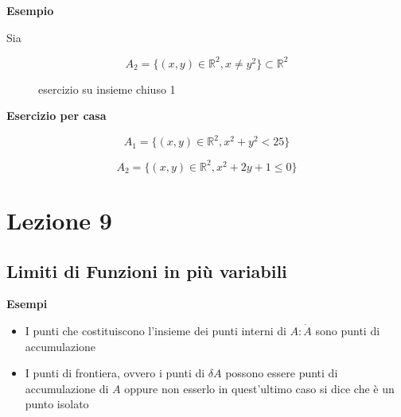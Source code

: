 \documentclass[11pt]{article}
\begin{document}
\textbf{Esempio} 

Sia

\[
    A_2= \{ (x,y) \in \mathbb{R}^{2}, x \neq y^{2}\} \subset \mathbb{R}^{2}
\]

\begin{figure}[ht]
    \centering
    \caption{esercizio su insieme chiuso 1}
    \label{fig:esercizio-su-insieme-chiuso-1}
\end{figure}


\textbf{Esercizio per casa} 

\[
    A_1= \{ (x,y) \in \mathbb{R}^{2}, x^{2}+ y^{2} < 25\}
\]

\[
    A_2= \{ (x,y) \in \mathbb{R}^{2}, x^{2}+ 2y +1  \le  0\}
\]


\section{Lezione 9}

\subsection{Limiti di Funzioni in più variabili}



\textbf{Esempi} 

\begin{itemize}
    \item I punti che costituiscono l'insieme dei punti interni di $A: \dot A$  sono punti di accumulazione
    \item I punti di frontiera, ovvero i punti di $\delta A$ possono essere punti di accumulazione di $A$ oppure non esserlo in quest'ultimo caso si dice che è un punto isolato
\end{itemize}

\newpage

\end{document}
